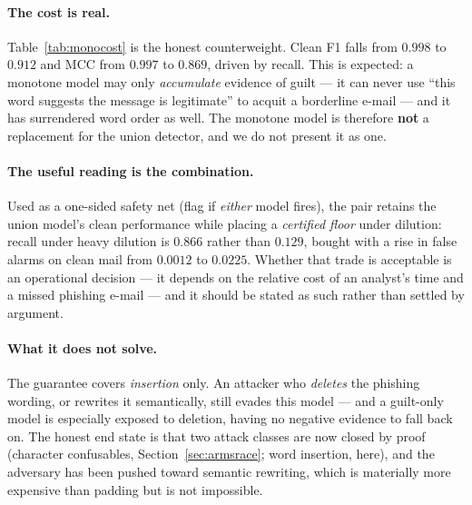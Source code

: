 \documentclass[11pt]{article}
\begin{document}
\paragraph{The cost is real.} Table~\ref{tab:monocost} is the honest counterweight. Clean F1 falls from
$0.998$ to $0.912$ and MCC from $0.997$ to $0.869$, driven by recall. This is expected: a monotone model
may only \emph{accumulate} evidence of guilt --- it can never use ``this word suggests the message is
legitimate'' to acquit a borderline e-mail --- and it has surrendered word order as well. The monotone
model is therefore \textbf{not} a replacement for the union detector, and we do not present it as one.

\paragraph{The useful reading is the combination.} Used as a one-sided safety net (flag if
\emph{either} model fires), the pair retains the union model's clean performance while placing a
\emph{certified floor} under dilution: recall under heavy dilution is $0.866$ rather than $0.129$,
bought with a rise in false alarms on clean mail from $0.0012$ to $0.0225$. Whether that trade is
acceptable is an operational decision --- it depends on the relative cost of an analyst's time and a
missed phishing e-mail --- and it should be stated as such rather than settled by argument.

\paragraph{What it does not solve.} The guarantee covers \emph{insertion} only. An attacker who
\emph{deletes} the phishing wording, or rewrites it semantically, still evades this model --- and a
guilt-only model is especially exposed to deletion, having no negative evidence to fall back on. The
honest end state is that two attack classes are now closed by proof (character confusables,
Section~\ref{sec:armsrace}; word insertion, here), and the adversary has been pushed toward semantic
rewriting, which is materially more expensive than padding but is not impossible.
\end{document}
